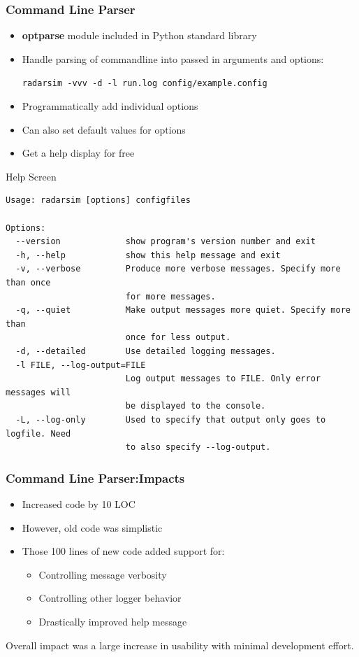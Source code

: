 \documentclass[red, hyperref={pdfpagelabels=false}]{beamer}
\begin{document}
\begin{frame}[fragile]
  \lstset{language=Python}
  \frametitle{Command Line Parser}
  \begin{itemize}
    \item \textbf{optparse} module included in Python standard library
    \item Handle parsing of commandline into passed in arguments and options:

    \verb$radarsim -vvv -d -l run.log config/example.config$
    \item Programmatically add individual options
    
    \item Can also set default values for options
    \item Get a help display for free
  \end{itemize}
\end{frame}

\begin{frame}[fragile]{Help Screen}
\tiny
\begin{verbatim}
Usage: radarsim [options] configfiles

Options:
  --version             show program's version number and exit
  -h, --help            show this help message and exit
  -v, --verbose         Produce more verbose messages. Specify more than once
                        for more messages.
  -q, --quiet           Make output messages more quiet. Specify more than
                        once for less output.
  -d, --detailed        Use detailed logging messages.
  -l FILE, --log-output=FILE
                        Log output messages to FILE. Only error messages will
                        be displayed to the console.
  -L, --log-only        Used to specify that output only goes to logfile. Need
                        to also specify --log-output.
\end{verbatim}
\end{frame}

\begin{frame}
  \frametitle{Command Line Parser:Impacts}
  \begin{itemize}
    \item Increased code by 10 LOC
    \item However, old code was simplistic
    \item Those 100 lines of new code added support for:
    \begin{itemize}
      \item Controlling message verbosity
      \item Controlling other logger behavior
      \item Drastically improved help message
    \end{itemize}
  \end{itemize}
  Overall impact was a large increase in usability with minimal development effort.
\end{frame}
\end{document}
